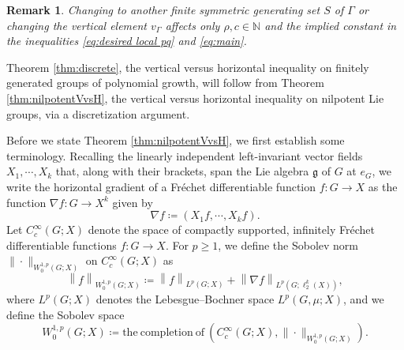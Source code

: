 \documentclass[11pt,reqno]{amsart}
\newtheorem{remark}[theorem]{Remark}
\newcommand{\1}{\mathbf 1}
\begin{document}
\begin{remark}
    Changing to another finite symmetric generating set $S$ of $\Gamma$ or changing the vertical element $v_\Gamma$ affects only $\rho,c\in \mathbb{N}$ and the implied constant in the inequalities \eqref{eq:desired local pq} and \eqref{eq:main}.
\end{remark}

Theorem \ref{thm:discrete}, the vertical versus horizontal inequality on finitely generated groups of polynomial growth, will follow from Theorem \ref{thm:nilpotentVvsH}, the vertical versus horizontal inequality on nilpotent Lie groups, via a discretization argument.

Before we state Theorem \ref{thm:nilpotentVvsH}, we first establish some terminology. Recalling the linearly independent left-invariant vector fields $X_1,\cdots, X_k$ that, along with their brackets, span the Lie algebra $\mathfrak{g}$ of $G$ at $e_G$, we write the horizontal gradient of a Fr\'echet differentiable function $f:G\to X$ as the function $\nabla f:G\to X^k$ given by
\[
\nabla f\coloneqq \left(X_1f,\cdots,X_kf\right).
\]
Let $C_c^\infty\left(G;X\right)$ denote the space of compactly supported, infinitely Fr\'echet differentiable functions $f:G\to X$. For $p\ge 1$, we define the Sobolev norm $\|\cdot\|_{W_0^{1,p}\left(G;X\right)}$ on $C_c^\infty\left(G;X\right)$ as
\[
\left\|f\right\|_{W_0^{1,p}\left(G;X\right)}\coloneqq \left\|f\right\|_{L^{p}\left(G;X\right)}+\left\|\nabla f\right\|_{L^{p}\left(G;\ell_2^k\left(X\right)\right)},
\]
where $L^p\left(G;X\right)$ denotes the Lebesgue--Bochner space $L^p\left(G,\mu;X\right)$, and we define the Sobolev space
\[
W_0^{1,p}\left(G;X\right)\coloneqq \mathrm{the~completion~of~}\left(C_c^\infty\left(G;X\right),\|\cdot\|_{W_0^{1,p}\left(G;X\right)}\right).
\]
\end{document}
